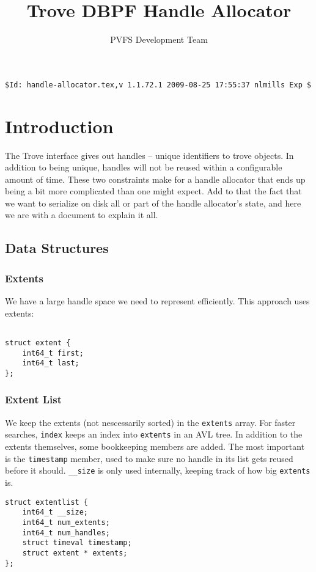 \documentclass[10pt]{article} %
\title{Trove DBPF Handle Allocator }
\author{PVFS Development Team}
\begin{document}
\maketitle
\begin{verbatim}$Id: handle-allocator.tex,v 1.1.72.1 2009-08-25 17:55:37 nlmills Exp $\end{verbatim}

\section{Introduction}

The Trove interface gives out handles -- unique identifiers to trove
objects.  In addition to being unique, handles will not be reused within
a configurable amount of time.  These two constraints make for a handle
allocator that ends up being a bit more complicated than one might
expect.  Add to that the fact that we want to serialize on disk all or
part of the handle allocator's state, and here we are with a document to
explain it all.

\subsection{Data Structures}
\subsubsection{Extents}
We have a large handle space we need to represent efficiently.  This
approach uses extents:
\begin{verbatim}

struct extent {
	int64_t first;
	int64_t last;
};

\end{verbatim}

\subsubsection{Extent List}
We keep the extents (not nescessarily sorted) in the \texttt{extents}
array.  For faster searches, \texttt{index} keeps an index into
\texttt{extents} in an AVL tree. 
In addition
to the extents themselves, some bookkeeping members are added.  The most
important is the \texttt{timestamp} member, used to make sure no handle in
its list gets reused before it should.  \texttt{\_\_size} is only used
internally, keeping track of how big \texttt{extents} is.  

\begin{verbatim}
struct extentlist {
	int64_t __size;
	int64_t num_extents;
	int64_t num_handles;
	struct timeval timestamp;
	struct extent * extents;
};
\end{verbatim}
\end{document}
